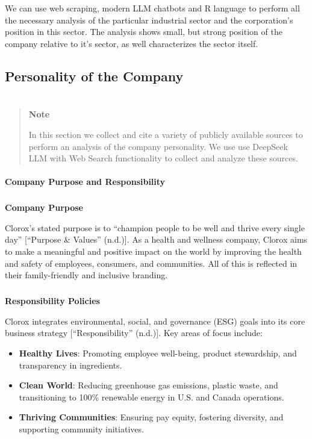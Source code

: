 \documentclass[
  letterpaper,
  DIV=11,
  numbers=noendperiod]{scrartcl}
\makeatletter
\let\oldparagraph\paragraph
\renewcommand{\paragraph}{
    \@ifstar
      \xxxParagraphStar
      \xxxParagraphNoStar
  }
\newcommand{\xxxParagraphStar}[1]{\oldparagraph*{#1}\mbox{}}
\newcommand{\xxxParagraphNoStar}[1]{\oldparagraph{#1}\mbox{}}
\let\oldsubparagraph\subparagraph
\renewcommand{\subparagraph}{
    \@ifstar
      \xxxSubParagraphStar
      \xxxSubParagraphNoStar
  }
\newcommand{\xxxSubParagraphStar}[1]{\oldsubparagraph*{#1}\mbox{}}
\newcommand{\xxxSubParagraphNoStar}[1]{\oldsubparagraph{#1}\mbox{}}
\providecommand{\tightlist}{%
  \setlength{\itemsep}{0pt}\setlength{\parskip}{0pt}}\usepackage{longtable,booktabs,array}
\makeatother
\begin{document}
We can use web scraping, modern LLM chatbots and R language to perform
all the necessary analysis of the particular industrial sector and the
corporation's position in this sector. The analysis shows small, but
strong position of the company relative to it's sector, as well
characterizes the sector itself.

\subsection{Personality of the
Company}\label{personality-of-the-company}

\section{}\label{section-2}

\begin{quote}
\textbf{Note}

In this section we collect and cite a variety of publicly available
sources to perform an analysis of the company personality. We use use
DeepSeek LLM with Web Search functionality to collect and analyze these
sources.
\end{quote}

\paragraph{\texorpdfstring{\textbf{Company Purpose and
Responsibility}}{Company Purpose and Responsibility}}\label{company-purpose-and-responsibility}

\subparagraph{\texorpdfstring{\textbf{Company
Purpose}}{Company Purpose}}\label{company-purpose}

Clorox's stated purpose is to ``champion people to be well and thrive
every single day'' {[}{``Purpose \& {Values}''} (n.d.){]}. As a health
and wellness company, Clorox aims to make a meaningful and positive
impact on the world by improving the health and safety of employees,
consumers, and communities. All of this is reflected in their
family-friendly and inclusive branding.

\subparagraph{\texorpdfstring{\textbf{Responsibility
Policies}}{Responsibility Policies}}\label{responsibility-policies}

Clorox integrates environmental, social, and governance (ESG) goals into
its core business strategy {[}{``Responsibility''} (n.d.){]}. Key areas
of focus include:

\begin{itemize}
\tightlist
\item
  \textbf{Healthy Lives}: Promoting employee well-being, product
  stewardship, and transparency in ingredients.\\
\item
  \textbf{Clean World}: Reducing greenhouse gas emissions, plastic
  waste, and transitioning to 100\% renewable energy in U.S. and Canada
  operations.\\
\item
  \textbf{Thriving Communities}: Ensuring pay equity, fostering
  diversity, and supporting community initiatives.
\end{itemize}
\end{document}

